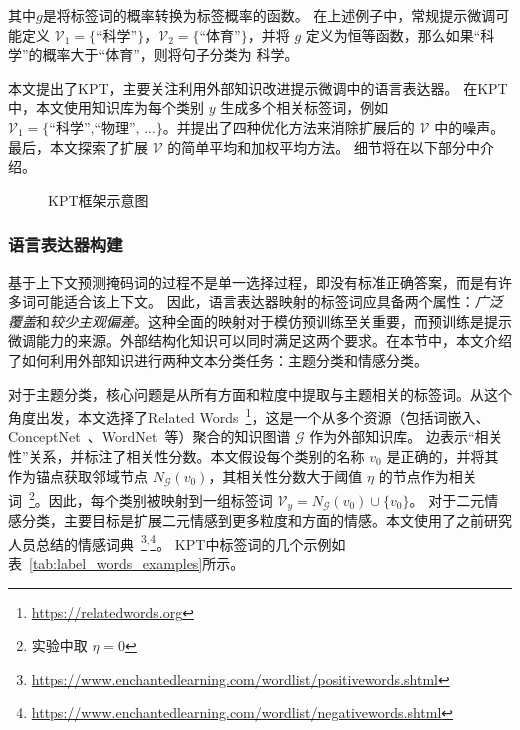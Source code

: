 其中$g$是将标签词的概率转换为标签概率的函数。
在上述例子中，常规提示微调可能定义 $\mathcal{V}_1=\{\text{``科学''}\}$，$\mathcal{V}_2=\text{\{``体育''}\}$，并将 $g$ 定义为恒等函数，那么如果“科学”的概率大于“体育”，则将句子分类为 \textsc{科学}。

本文提出了KPT，主要关注利用外部知识改进提示微调中的语言表达器。
在KPT中，本文使用知识库为每个类别 $y$ 生成多个相关标签词，例如 $\mathcal{V}_1 = \text{\{``科学'',``物理'', ...\}}$。并提出了四种优化方法来消除扩展后的 $\mathcal{V}$ 中的噪声。最后，本文探索了扩展 $\mathcal{V}$ 的简单平均和加权平均方法。
细节将在以下部分中介绍。

\begin{figure*}[!htbp]
  \centering
{}
  \caption{KPT框架示意图}
  \label{fig:my_label}
\end{figure*}


\subsubsection{语言表达器构建}
\label{sec:cons}

基于上下文预测掩码词的过程不是单一选择过程，即没有标准正确答案，而是有许多词可能适合该上下文。
因此，语言表达器映射的标签词应具备两个属性：\textit{广泛覆盖}和\textit{较少主观偏差}。这种全面的映射对于模仿预训练至关重要，而预训练是提示微调能力的来源。外部结构化知识可以同时满足这两个要求。在本节中，本文介绍了如何利用外部知识进行两种文本分类任务：主题分类和情感分类。

对于主题分类，核心问题是从所有方面和粒度中提取与主题相关的标签词。从这个角度出发，本文选择了Related Words~\footnote{\url{https://relatedwords.org}}，这是一个从多个资源（包括词嵌入、ConceptNet~\cite{speer2017conceptnet}、WordNet~\cite{pedersen2004wordnet}等）聚合的知识图谱 $\mathcal{G}$ 作为外部知识库。
边表示“相关性”关系，并标注了相关性分数。本文假设每个类别的名称 $v_0$ 是正确的，并将其作为锚点获取邻域节点 $N_{\mathcal{G}}(v_0)$，其相关性分数大于阈值 $\eta$ 的节点作为相关词~\footnote{实验中取 $\eta=0$}。因此，每个类别被映射到一组标签词 $\mathcal{V}_{y} = N_{\mathcal{G}}(v_0) \cup \{v_0\}$。
对于二元情感分类，主要目标是扩展二元情感到更多粒度和方面的情感。本文使用了之前研究人员总结的情感词典~\footnote{\url{https://www.enchantedlearning.com/wordlist/positivewords.shtml}}$^{,}$\footnote{ \url{https://www.enchantedlearning.com/wordlist/negativewords.shtml}}。
KPT中标签词的几个示例如表~\ref{tab:label_words_examples}所示。

